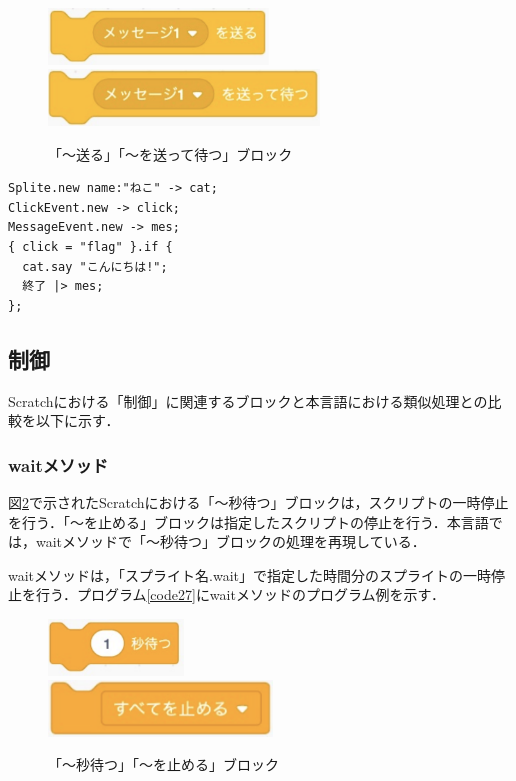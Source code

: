 \documentclass[10pt,a4j]{ltjsarticle}
\begin{document}
\begin{figure}[H]
  \centering
  \includegraphics[height=15mm]{images/send.pdf} 
  \includegraphics[height=15mm]{images/send2.pdf} 
  \caption{「〜送る」「〜を送って待つ」ブロック}
  \label{fig:send}
\end{figure}

\begin{lstlisting}[caption=イベント処理のプログラム例, label=code26]
Splite.new name:"ねこ" -> cat;
ClickEvent.new -> click;
MessageEvent.new -> mes;
{ click = "flag" }.if {
  cat.say "こんにちは!";
  終了 |> mes;
};
\end{lstlisting}

\subsection{制御}
Scratchにおける「制御」に関連するブロックと本言語における類似処理との比較を以下に示す．
\subsubsection{waitメソッド}
図\ref{fig:wait}で示されたScratchにおける「〜秒待つ」ブロックは，スクリプトの一時停止を行う．「〜を止める」ブロックは指定したスクリプトの停止を行う．本言語では，waitメソッドで「〜秒待つ」ブロックの処理を再現している．

waitメソッドは，「スプライト名.wait」で指定した時間分のスプライトの一時停止を行う．プログラム\ref{code27}にwaitメソッドのプログラム例を示す．

\begin{figure}[H]
  \centering
  \includegraphics[height=15mm]{images/wait.pdf} \\
  \includegraphics[height=15mm]{images/stop.pdf} 
  \caption{「〜秒待つ」「〜を止める」ブロック}
  \label{fig:wait}
\end{figure}
\end{document}
